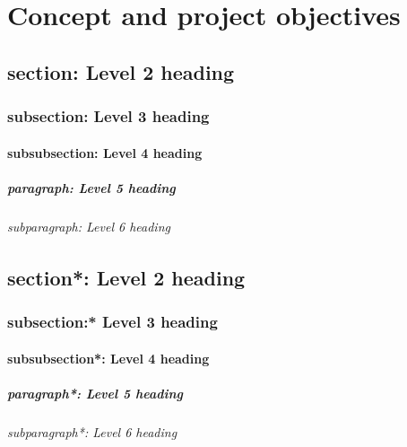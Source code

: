 

\chapter{Concept and project objectives}

\section{section: Level 2 heading}
\subsection{subsection: Level 3 heading}
\subsubsection{subsubsection: Level 4 heading}
\paragraph{paragraph: Level 5 heading}
\subparagraph{subparagraph: Level 6 heading}

\section*{section*: Level 2 heading}
\subsection*{subsection:* Level 3 heading}
\subsubsection*{subsubsection*: Level 4 heading}
\paragraph*{paragraph*: Level 5 heading}
\subparagraph*{subparagraph*: Level 6 heading}

